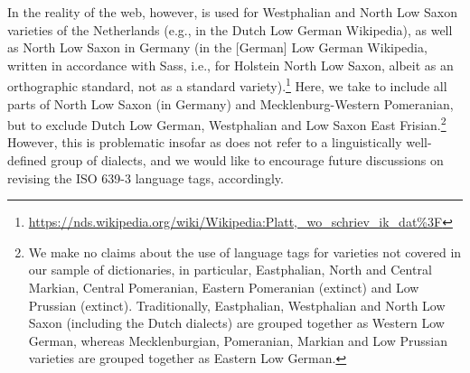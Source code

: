 {{    } In the reality of the web, however,  is used for Westphalian and North Low Saxon varieties of the Netherlands (e.g., in the Dutch Low German Wikipedia), as well as North Low Saxon in Germany (in the [German] Low German Wikipedia, written in accordance with Sass, i.e.,  for Holstein North Low Saxon, albeit as an orthographic standard, not as a standard variety).\footnote{
        \url{https://nds.wikipedia.org/wiki/Wikipedia:Platt,_wo_schriev_ik_dat\%3F}
    }
    Here, we take  to include all parts of North Low Saxon (in Germany) and Mecklenburg-Western Pomeranian, but to exclude Dutch Low German, Westphalian and Low Saxon East Frisian.\footnote{
      We make no claims about the use of language tags for varieties not covered in our sample of dictionaries, in particular, Eastphalian, North and Central Markian, Central Pomeranian, Eastern Pomeranian (extinct) and Low Prussian (extinct). Traditionally, Eastphalian, Westphalian and North Low Saxon (including the Dutch dialects) are grouped together as Western Low German, whereas Mecklenburgian, Pomeranian, Markian and Low Prussian varieties are grouped together as Eastern Low German.
    }
    However, this is problematic insofar as  does not refer to a linguistically well-defined group of dialects, and we would like to encourage future discussions on revising the ISO 639-3 language tags, accordingly.
}

